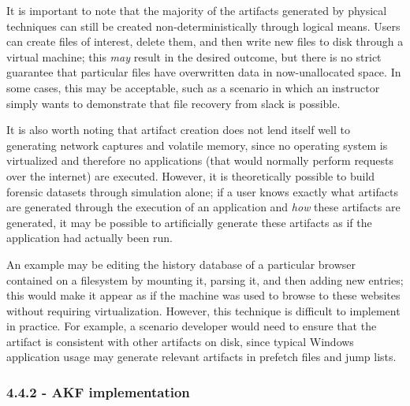 It is important to note that the majority of the artifacts generated by
physical techniques can still be created non-deterministically through
logical means. Users can create files of interest, delete them, and then
write new files to disk through a virtual machine; this \emph{may}
result in the desired outcome, but there is no strict guarantee that
particular files have overwritten data in now-unallocated space. In some
cases, this may be acceptable, such as a scenario in which an instructor
simply wants to demonstrate that file recovery from slack is possible.

It is also worth noting that artifact creation does not lend itself well
to generating network captures and volatile memory, since no operating
system is virtualized and therefore no applications (that would normally
perform requests over the internet) are executed. However, it is
theoretically possible to build forensic datasets through simulation
alone; if a user knows exactly what artifacts are generated through the
execution of an application and \emph{how} these artifacts are
generated, it may be possible to artificially generate these artifacts
as if the application had actually been run.

An example may be editing the history database of a particular browser
contained on a filesystem by mounting it, parsing it, and then adding
new entries; this would make it appear as if the machine was used to
browse to these websites without requiring virtualization. However, this
technique is difficult to implement in practice. For example, a scenario
developer would need to ensure that the artifact is consistent with
other artifacts on disk, since typical Windows application usage may
generate relevant artifacts in prefetch files and jump lists.

\subsubsection*{4.4.2 - AKF implementation}\label{akf-implementation}

